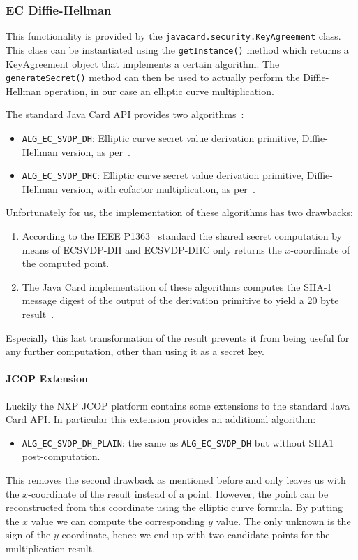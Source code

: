 \subsubsection{EC Diffie-Hellman}\label{sec:ecdh-api}

This functionality is provided by the \texttt{javacard.security.KeyAgreement}
class. This class can be instantiated using the \texttt{getInstance()} method
which returns a KeyAgreement object that implements a certain algorithm. The
\texttt{generateSecret()} method can then be used to actually perform the
Diffie-Hellman operation, in our case an elliptic curve multiplication.

The standard Java Card API provides two algorithms~\cite{JavaCard-2.2.2_API_documentation}:
\begin{itemize}
  \item \texttt{ALG\_EC\_SVDP\_DH}: Elliptic curve secret value derivation
    primitive, Diffie-Hellman version, as per~\cite{IEEE_P1363}.
  \item \texttt{ALG\_EC\_SVDP\_DHC}: Elliptic curve secret value derivation
    primitive, Diffie-Hellman version, with cofactor multiplication, as
    per~\cite{IEEE_P1363}.
\end{itemize}
Unfortunately for us, the implementation of these algorithms has two drawbacks:
\begin{enumerate}
  \item According to the IEEE P1363~\cite{IEEE_P1363} standard the shared
    secret computation by means of ECSVDP-DH and ECSVDP-DHC only returns the
    $x$-coordinate of the computed point.
  \item The Java Card implementation of these algorithms computes the SHA-1
    message digest of the output of the derivation primitive to yield a 20 byte
    result~\cite{JavaCard-2.2.2_API_documentation}.
\end{enumerate}

Especially this last transformation of the result prevents it from being useful
for any further computation, other than using it as a secret key.

\paragraph{JCOP Extension}

Luckily the NXP JCOP platform contains some extensions to the standard Java Card
API. In particular this extension provides an additional algorithm:
\begin{itemize}
  \item \texttt{ALG\_EC\_SVDP\_DH\_PLAIN}: the same as
    \texttt{ALG\_EC\_SVDP\_DH} but without SHA1 post-computation.
\end{itemize}
This removes the second drawback as mentioned before and only leaves us with the
$x$-coordinate of the result instead of a point. However, the point can be
reconstructed from this coordinate using the elliptic curve formula. By putting
the $x$ value we can compute the corresponding $y$ value. The only unknown is
the sign of the $y$-coordinate, hence we end up with two candidate points for
the multiplication result.

